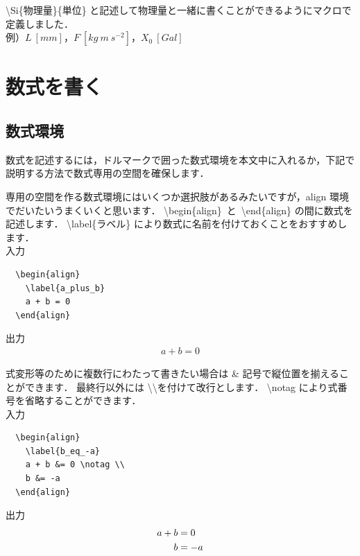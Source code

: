 \documentclass[11pt,a4j,onecolumn]{jsreport} %
\newcommand*{\Si}[2]{$#1\ [\si{#2}]$}
\begin{document}
\textbackslash Si\{物理量\}\{単位\} と記述して物理量と一緒に書くことができるようにマクロで定義しました．\\
\hspace{3em} 例）\Si{L}{mm}，\Si{F}{kg~m~s^{-2}}，\Si{X_0}{Gal}


\chapter{数式を書く}
\label{sec:math}

\section{数式環境}

数式を記述するには，ドルマークで囲った数式環境を本文中に入れるか，下記で説明する方法で数式専用の空間を確保します．

専用の空間を作る数式環境にはいくつか選択肢があるみたいですが，align 環境でだいたいうまくいくと思います．
\textbackslash begin\{align\}~と~\textbackslash end\{align\} の間に数式を記述します．
\textbackslash label\{ラベル\} により数式に名前を付けておくことをおすすめします．\\

入力
\begin{verbatim}
  \begin{align}
    \label{a_plus_b}
    a + b = 0
  \end{align}
\end{verbatim}

出力
\begin{align}
  \label{a_plus_b}
  a + b = 0
\end{align}

式変形等のために複数行にわたって書きたい場合は \& 記号で縦位置を揃えることができます．
最終行以外には \textbackslash\textbackslash を付けて改行とします．
\textbackslash notag により式番号を省略することができます．\\

入力
\begin{verbatim}
  \begin{align}
    \label{b_eq_-a}
    a + b &= 0 \notag \\
    b &= -a
  \end{align}
\end{verbatim}

出力
\begin{align}
  \label{b_eq_-a}
  a + b &= 0 \notag \\
  b &= -a
\end{align}
\end{document}
